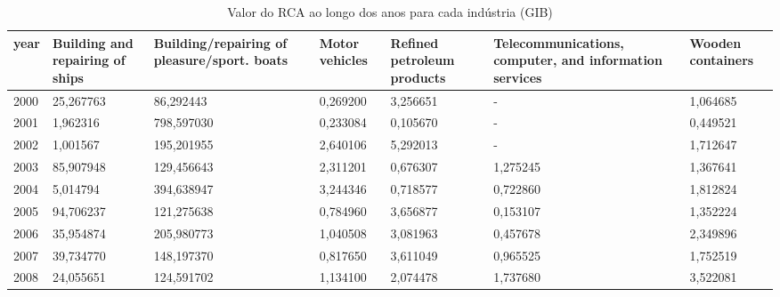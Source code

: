 \begin{table}
\centering
\caption{Valor do RCA ao longo dos anos para cada indústria (GIB)}
\begin{tabular}{p{1cm}p{2cm}p{2cm}p{2cm}p{2cm}p{2cm}p{2cm}}
\toprule
 year &  Building and repairing of ships &  Building/repairing of pleasure/sport. boats &  Motor vehicles &  Refined petroleum products &  Telecommunications, computer, and information services &  Wooden containers \\
\midrule
 2000 &                        25,267763 &                                    86,292443 &        0,269200 &                    3,256651 &                                                  - &           1,064685 \\
 2001 &                         1,962316 &                                   798,597030 &        0,233084 &                    0,105670 &                                                  - &           0,449521 \\
 2002 &                         1,001567 &                                   195,201955 &        2,640106 &                    5,292013 &                                                  - &           1,712647 \\
 2003 &                        85,907948 &                                   129,456643 &        2,311201 &                    0,676307 &                                           1,275245 &           1,367641 \\
 2004 &                         5,014794 &                                   394,638947 &        3,244346 &                    0,718577 &                                           0,722860 &           1,812824 \\
 2005 &                        94,706237 &                                   121,275638 &        0,784960 &                    3,656877 &                                           0,153107 &           1,352224 \\
 2006 &                        35,954874 &                                   205,980773 &        1,040508 &                    3,081963 &                                           0,457678 &           2,349896 \\
 2007 &                        39,734770 &                                   148,197370 &        0,817650 &                    3,611049 &                                           0,965525 &           1,752519 \\
 2008 &                        24,055651 &                                   124,591702 &        1,134100 &                    2,074478 &                                           1,737680 &           3,522081 \\

\end{tabular}
\end{table}
